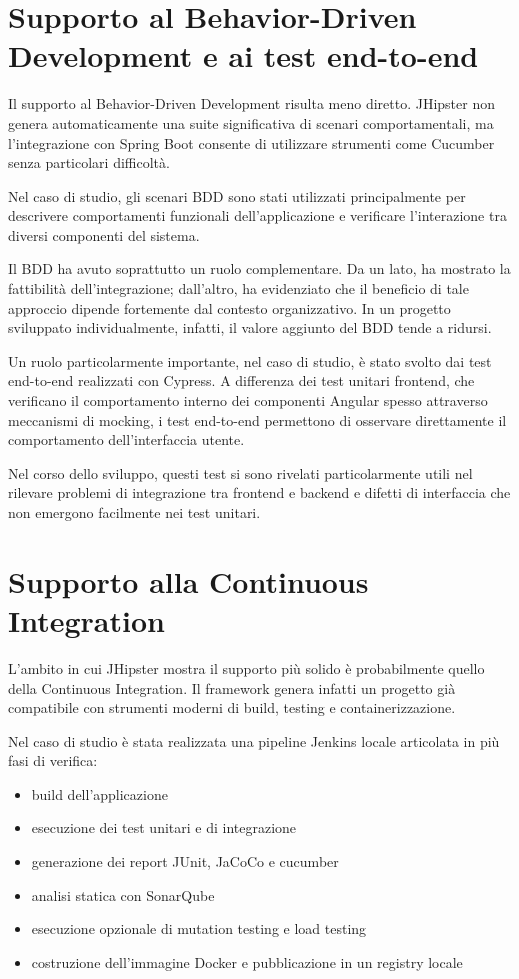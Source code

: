 \section{Supporto al Behavior-Driven Development e ai test end-to-end}
\label{sec:evaluation-bdd}

Il supporto al Behavior-Driven Development risulta meno diretto. JHipster non genera automaticamente una suite significativa di scenari comportamentali, ma l’integrazione con Spring Boot consente di utilizzare strumenti come Cucumber senza particolari difficoltà.

Nel caso di studio, gli scenari BDD sono stati utilizzati principalmente per descrivere comportamenti funzionali dell’applicazione e verificare l’interazione tra diversi componenti del sistema.

Il BDD ha avuto soprattutto un ruolo complementare. Da un lato, ha mostrato la fattibilità dell’integrazione; dall’altro, ha evidenziato che il beneficio di tale approccio dipende fortemente dal contesto organizzativo. In un progetto sviluppato individualmente, infatti, il valore aggiunto del BDD tende a ridursi.

Un ruolo particolarmente importante, nel caso di studio, è stato svolto dai test end-to-end realizzati con Cypress. A differenza dei test unitari frontend, che verificano il comportamento interno dei componenti Angular spesso attraverso meccanismi di mocking, i test end-to-end permettono di osservare direttamente il comportamento dell’interfaccia utente.

Nel corso dello sviluppo, questi test si sono rivelati particolarmente utili nel rilevare problemi di integrazione tra frontend e backend e difetti di interfaccia che non emergono facilmente nei test unitari.

\section{Supporto alla Continuous Integration}
\label{sec:evaluation-ci}

L’ambito in cui JHipster mostra il supporto più solido è probabilmente quello della Continuous Integration. Il framework genera infatti un progetto già compatibile con strumenti moderni di build, testing e containerizzazione.

Nel caso di studio è stata realizzata una pipeline Jenkins locale articolata in più fasi di verifica:

\begin{itemize}
	\item build dell’applicazione
	\item esecuzione dei test unitari e di integrazione
	\item generazione dei report JUnit, JaCoCo e cucumber
	\item analisi statica con SonarQube
	\item esecuzione opzionale di mutation testing e load testing
	\item costruzione dell’immagine Docker e pubblicazione in un registry locale
\end{itemize}

